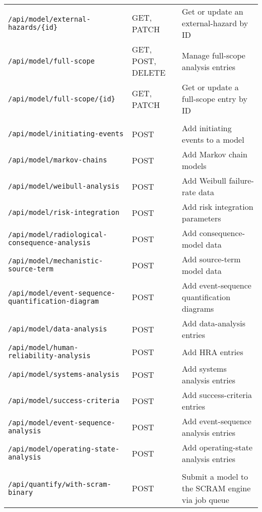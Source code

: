 \begin{landscape}
\begin{longtable}{@{}lll@{}}
\texttt{/api/model/external-hazards/\{id\}} & GET, PATCH & Get or update an external-hazard by ID \\
\texttt{/api/model/full-scope} & GET, POST, DELETE & Manage full-scope analysis entries \\
\texttt{/api/model/full-scope/\{id\}} & GET, PATCH & Get or update a full-scope entry by ID \\
\addlinespace
\multicolumn{3}{@{}l}{\textbf{Other PRA Components}}\\
\midrule
\texttt{/api/model/initiating-events} & POST & Add initiating events to a model \\
\texttt{/api/model/markov-chains} & POST & Add Markov chain models \\
\texttt{/api/model/weibull-analysis} & POST & Add Weibull failure-rate data \\
\texttt{/api/model/risk-integration} & POST & Add risk integration parameters \\
\texttt{/api/model/radiological-consequence-analysis} & POST & Add consequence-model data \\
\texttt{/api/model/mechanistic-source-term} & POST & Add source-term model data \\
\texttt{/api/model/event-sequence-quantification-diagram} & POST & Add event-sequence quantification diagrams \\
\texttt{/api/model/data-analysis} & POST & Add data-analysis entries \\
\texttt{/api/model/human-reliability-analysis} & POST & Add HRA entries \\
\texttt{/api/model/systems-analysis} & POST & Add systems analysis entries \\
\texttt{/api/model/success-criteria} & POST & Add success-criteria entries \\
\texttt{/api/model/event-sequence-analysis} & POST & Add event-sequence analysis entries \\
\texttt{/api/model/operating-state-analysis} & POST & Add operating-state analysis entries \\
\addlinespace
\multicolumn{3}{@{}l}{\textbf{Quantification}}\\
\midrule
\texttt{/api/quantify/with-scram-binary} & POST & Submit a model to the SCRAM engine via job queue \\
\end{longtable}
\end{landscape}
